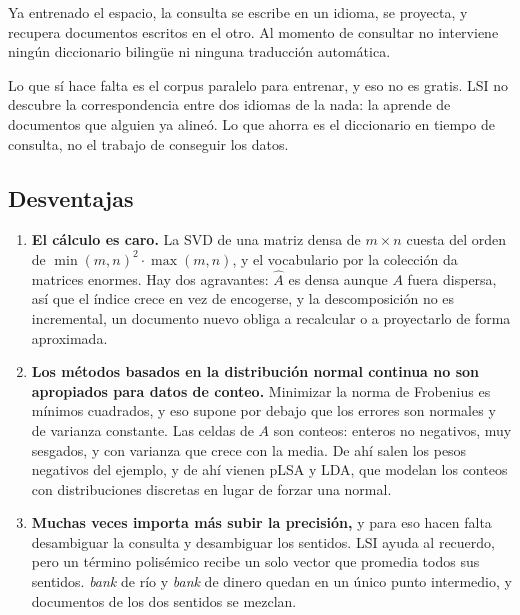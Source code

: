 \documentclass[11pt,letterpaper]{article}
\begin{document}
Ya entrenado el espacio, la consulta se escribe en un idioma, se
proyecta, y recupera documentos escritos en el otro. Al momento de
consultar no interviene ningún diccionario bilingüe ni ninguna
traducción automática.

\begin{ojo}
    Lo que sí hace falta es el corpus paralelo para entrenar, y eso no
    es gratis. LSI no descubre la correspondencia entre dos idiomas de
    la nada: la aprende de documentos que alguien ya alineó. Lo que
    ahorra es el diccionario en tiempo de consulta, no el trabajo de
    conseguir los datos.
\end{ojo}

\subsection*{Desventajas}

\begin{enumerate}[itemsep=0.5em]
    \item \textbf{El cálculo es caro.} La SVD de una matriz densa
          de $m \times n$ cuesta del orden de
          $\min(m,n)^2 \cdot \max(m,n)$, y el vocabulario por la
          colección da matrices enormes. Hay dos agravantes: $\hat{A}$ es densa aunque $A$ fuera
          dispersa, así que el índice crece en vez de encogerse, y la
          descomposición no es incremental, un documento nuevo obliga
          a recalcular o a proyectarlo de forma aproximada.
    \item \textbf{Los métodos basados en la distribución normal
          continua no son apropiados para datos de conteo.} Minimizar
          la norma de Frobenius es mínimos cuadrados, y eso supone por
          debajo que los errores son normales y de varianza constante.
          Las celdas de $A$ son conteos: enteros no negativos, muy
          sesgados, y con varianza que crece con la media. De ahí
          salen los pesos negativos del ejemplo, y de ahí vienen pLSA
          y LDA, que modelan los conteos con distribuciones discretas
          en lugar de forzar una normal.
    \item \textbf{Muchas veces importa más subir la precisión,} y para
          eso hacen falta desambiguar la consulta y desambiguar los
          sentidos. LSI ayuda al recuerdo, pero un término polisémico
          recibe un solo vector que promedia todos sus sentidos.
          \textit{bank} de río y \textit{bank} de dinero quedan en un
          único punto intermedio, y documentos de los dos sentidos se
          mezclan.
\end{enumerate}
\end{document}

